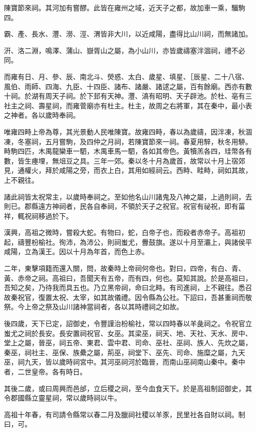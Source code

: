 陳寶節來祠。其河加有嘗醪。此皆在雍州之域，近天子之都，故加車一乘，騮駒四。

霸、產、長水、灃、澇、涇、渭皆非大川，以近咸陽，盡得比山川祠，而無諸加。

汧、洛二淵，鳴澤、蒲山、嶽胥山之屬，為小山川，亦皆歲禱塞泮涸祠，禮不必同。

而雍有日、月、參、辰、南北斗、熒惑、太白、歲星、填星、［辰星、二十八宿、風伯、雨師、四海、九臣、十四臣、諸布、諸嚴、諸逑之屬，百有餘廟。西亦有數十祠。於湖有周天子祠。於下邽有天神。灃、滈有昭明、天子辟池。於杜、亳有三社主之祠、壽星祠，而雍菅廟亦有杜主。杜主，故周之右將軍，其在秦中，最小表之神者。各以歲時奉祠。

唯雍四畤上帝為尊，其光景動人民唯陳寶。故雍四畤，春以為歲禱，因泮凍，秋涸凍，冬塞祠，五月嘗駒，及四仲之月祠，若陳寶節來一祠。春夏用騂，秋冬用駵。畤駒四匹，木禺龍欒車一駟，木禺車馬一駟，各如其帝色。黃犢羔各四，珪幣各有數，皆生瘞埋，無俎豆之具。三年一郊。秦以冬十月為歲首，故常以十月上宿郊見，通權火，拜於咸陽之旁，而衣上白，其用如經祠云。西畤、畦畤，祠如其故，上不親往。

諸此祠皆太祝常主，以歲時奉祠之。至如他名山川諸鬼及八神之屬，上過則祠，去則已。郡縣遠方神祠者，民各自奉祠，不領於天子之祝官。祝官有祕祝，即有菑祥，輒祝祠移過於下。

漢興，高祖之微時，嘗殺大蛇。有物曰，蛇，白帝子也，而殺者赤帝子。高祖初起，禱豐枌榆社。徇沛，為沛公，則祠蚩尤，釁鼓旗。遂以十月至灞上，與諸侯平咸陽，立為漢王。因以十月為年首，而色上赤。

二年，東擊項籍而還入關，問，故秦時上帝祠何帝也。對曰，四帝，有白、青、黃、赤帝之祠。高祖曰，吾聞天有五帝，而有四，何也。莫知其說。於是高祖曰，吾知之矣，乃待我而具五也。乃立黑帝祠，命曰北畤。有司進祠，上不親往。悉召故秦祝官，復置太祝、太宰，如其故儀禮。因令縣為公社。下詔曰，吾甚重祠而敬祭。今上帝之祭及山川諸神當祠者，各以其時禮祠之如故。

後四歲，天下已定，詔御史，令豐謹治枌榆社，常以四時春以羊彘祠之。令祝官立蚩尤之祠於長安。長安置祠祝官、女巫。其梁巫，祠天、地、天社、天水、房中、堂上之屬，晉巫，祠五帝、東君、雲中君、司命、巫社、巫祠、族人、先炊之屬，秦巫，祠社主、巫保、族纍之屬，荊巫，祠堂下、巫先、司命、施糜之屬，九天巫，祠九天，皆以歲時祠宮中。其河巫祠河於臨晉，而南山巫祠南山秦中。秦中者，二世皇帝。各有時日。

其後二歲，或曰周興而邑邰，立后稷之祠，至今血食天下。於是高祖制詔御史，其令郡國縣立靈星祠，常以歲時祠以牛。

高祖十年春，有司請令縣常以春二月及臘祠社稷以羊豕，民里社各自財以祠。制曰，可。

